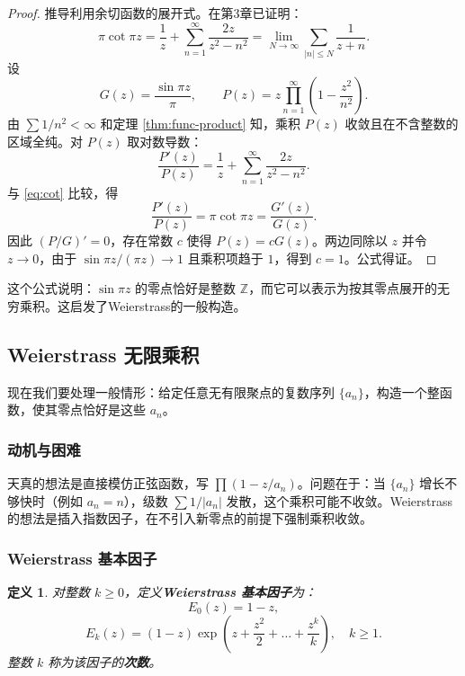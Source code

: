 \documentclass[UTF8]{ctexart}
\newtheorem{definition}[theorem]{定义}
\numberwithin{equation}{section}
\begin{document}
\begin{proof}
推导利用余切函数的展开式。在第3章已证明：
\begin{equation}\label{eq:cot}
\pi \cot \pi z = \frac{1}{z} + \sum_{n=1}^\infty \frac{2z}{z^2 - n^2} = \lim_{N \to \infty} \sum_{|n| \le N} \frac{1}{z+n}.
\end{equation}
设
\[
G(z) = \frac{\sin \pi z}{\pi}, \qquad P(z) = z \prod_{n=1}^\infty \left(1 - \frac{z^2}{n^2}\right).
\]
由 \(\sum 1/n^2 < \infty\) 和定理 \ref{thm:func-product} 知，乘积 \(P(z)\) 收敛且在不含整数的区域全纯。对 \(P(z)\) 取对数导数：
\[
\frac{P'(z)}{P(z)} = \frac{1}{z} + \sum_{n=1}^\infty \frac{2z}{z^2 - n^2}.
\]
与 \eqref{eq:cot} 比较，得
\[
\frac{P'(z)}{P(z)} = \pi \cot \pi z = \frac{G'(z)}{G(z)}.
\]
因此 \((P/G)' = 0\)，存在常数 \(c\) 使得 \(P(z) = c G(z)\)。两边同除以 \(z\) 并令 \(z \to 0\)，由于 \(\sin \pi z / (\pi z) \to 1\) 且乘积项趋于 \(1\)，得到 \(c = 1\)。公式得证。
\end{proof}

这个公式说明：\(\sin \pi z\) 的零点恰好是整数 \(\mathbb{Z}\)，而它可以表示为按其零点展开的无穷乘积。这启发了Weierstrass的一般构造。

\subsection{Weierstrass 无限乘积}

现在我们要处理一般情形：给定任意无有限聚点的复数序列 \(\{a_n\}\)，构造一个整函数，使其零点恰好是这些 \(a_n\)。

\subsubsection{动机与困难}

天真的想法是直接模仿正弦函数，写 \(\prod (1 - z/a_n)\)。问题在于：当 \(\{a_n\}\) 增长不够快时（例如 \(a_n = n\)），级数 \(\sum 1/|a_n|\) 发散，这个乘积可能不收敛。Weierstrass 的想法是插入指数因子，在不引入新零点的前提下强制乘积收敛。

\subsubsection{Weierstrass 基本因子}

\begin{definition}\label{def:Ek}
对整数 \(k \ge 0\)，定义\textbf{Weierstrass 基本因子}为：
\[
E_0(z) = 1 - z,
\]
\[
E_k(z) = (1 - z) \exp\left(z + \frac{z^2}{2} + \dots + \frac{z^k}{k}\right), \quad k \ge 1.
\]
整数 \(k\) 称为该因子的\textbf{次数}。
\end{definition}
\end{document}
